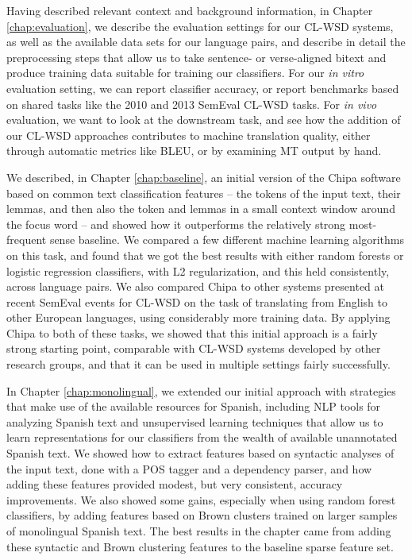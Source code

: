 Having described relevant context and background information, in Chapter
\ref{chap:evaluation}, we describe the evaluation settings for our CL-WSD
systems, as well as the available data sets for our language pairs, and
describe in detail the preprocessing steps that allow us to take sentence- or
verse-aligned bitext and produce training data suitable for training our
classifiers. For our \emph{in vitro} evaluation setting, we can report
classifier accuracy, or report benchmarks based on shared tasks like the 2010
and 2013 SemEval CL-WSD tasks. For \emph{in vivo} evaluation, we want to look
at the downstream task, and see how the addition of our CL-WSD approaches
contributes to machine translation quality, either through automatic metrics
like BLEU, or by examining MT output by hand.

We described, in Chapter \ref{chap:baseline}, an initial version of the Chipa
software based on common text classification features -- the tokens of the
input text, their lemmas, and then also the token and lemmas in a small context
window around the focus word -- and showed how it outperforms the relatively
strong most-frequent sense baseline. We compared a few different machine
learning algorithms on this task, and found that we got the best results with
either random forests or logistic regression classifiers, with L2
regularization, and this held consistently, across language pairs.
We also compared Chipa to other systems presented at recent SemEval events for
CL-WSD on the task of translating from English to other European languages,
using considerably more training data. By applying Chipa to both of these
tasks, we showed that this initial approach is a fairly strong starting point,
comparable with CL-WSD systems developed by other research groups, and that it
can be used in multiple settings fairly successfully.

In Chapter \ref{chap:monolingual}, we extended our initial approach with
strategies that make use of the available resources for Spanish, including NLP
tools for analyzing Spanish text and unsupervised learning techniques that
allow us to learn representations for our classifiers from the wealth of
available unannotated Spanish text. We showed how to extract features based on
syntactic analyses of the input text, done with a POS tagger and a dependency
parser, and how adding these features provided modest, but very consistent,
accuracy improvements. We also showed some gains, especially when using random
forest classifiers, by adding features based on Brown clusters trained on
larger samples of monolingual Spanish text. The best results in the chapter
came from adding these syntactic and Brown clustering features to the baseline
sparse feature set.

